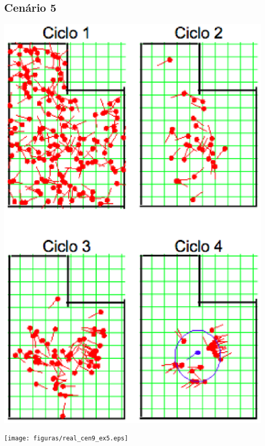 \subsection{Cenário 5}

{\centering
\includegraphics[scale=0.4]{figuras/cen9_ex5.eps}
\label{img:cen9_ex5}
\par}

{\centering
\texttt{[image: figuras/real\_cen9\_ex5.eps]}
\label{img:real_cen9_ex5}
\par}
